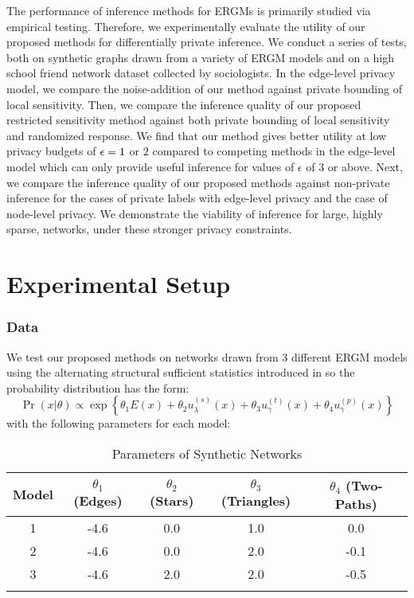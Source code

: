   The performance of inference methods for ERGMs is primarily studied via empirical testing. Therefore, we experimentally evaluate the utility of our proposed methods for differentially private inference. We conduct a series of tests, both on synthetic graphs drawn from a variety of ERGM models and on a high school friend network dataset collected by sociologists. In the edge-level privacy model, we compare the noise-addition of our method against private bounding of local sensitivity. Then, we compare the inference quality of our proposed restricted sensitivity method against both private bounding of local sensitivity and randomized response. We find that our method gives better utility at low privacy budgets of $\epsilon =1$ or $2$ compared to competing methods in the edge-level model which can only provide useful inference for values of $\epsilon$ of $3$ or above. Next, we compare the inference quality of our proposed methods against non-private inference for the cases of private labels with edge-level privacy and the case of node-level privacy. We demonstrate the viability of inference for large, highly sparse, networks, under these stronger privacy constraints.
 
 \section{Experimental Setup}
 
 \subsubsection*{Data}
 	We test our proposed methods on networks drawn from $3$ different ERGM models using the alternating structural sufficient statistics introduced in  so the probability distribution has the form:
 	$$\Pr(x | \theta) \propto \exp\left\{\theta_1 E(x) + \theta_2 u_\lambda^{(s)}(x) + \theta_3 u_\gamma^{(t)}(x)  + \theta_4 u_\gamma^{(p)}(x)\right\} $$
 	 with the following parameters for each model:
 	\begin{table}[!ht]
 		\centering
 		\begin{tabular}{|c|c|c|c|c|}
 			\hhline{|=====|}
 			Model & $\theta_1$ (Edges) & $\theta_2$ (Stars) & $\theta_3$ (Triangles) & $\theta_4$ (Two-Paths) \\ \hline
			1 & -4.6 & 0.0 & 1.0 & 0.0  \\
			2 & -4.6 & 0.0 & 2.0 & -0.1 \\
			3 & -4.6 & 2.0 & 2.0 & -0.5 \\
			\hhline{|=====|}
 		\end{tabular}
 	\caption{Parameters of Synthetic Networks}
 	\label{table:ergm_params}
 	\end{table}
 
